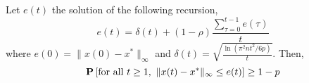 
\begin{lemma}\label{l:recursive_equation}
Let $e(t)$ the solution of the following recursion,
\[e(t) =\delta(t) + (1-\rho)\frac{\sum_{\tau=0}^{t-1}e(\tau)}{t}\]
where $e(0)=\|x(0) - x^*\|_{\infty}$ and \(\delta(t) = \sqrt{\frac{\ln(\pi^2n t^2/6p)}{t}} \). Then,
\[\bm{\mathrm{P}}\left[\text{for all }t \geq 1, ~\| x(t)-x^* \|_{\infty}\leq e(t)\right] \geq 1-p\] 
\end{lemma}
